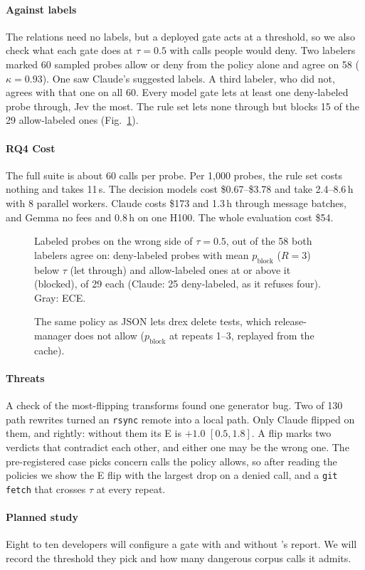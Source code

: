 \paragraph{Against labels} The relations need no labels, but a deployed gate
acts at a threshold, so we also check what each gate does at $\tau=0.5$ with
calls people would deny. Two labelers marked 60 sampled probes allow or deny
from the policy alone and agree on 58 ($\kappa=0.93$). One saw Claude's
suggested labels. A third labeler, who did not, agrees with that one on all 60.
Every model gate lets at least one deny-labeled probe through, Jev the most.
The rule set lets none through but blocks 15 of the 29 allow-labeled ones
(Fig.~\ref{fig:threshold}).

\paragraph{RQ4 Cost} The full suite is about 60 calls per probe. Per 1,000 probes, the rule set costs nothing and takes 11\,s. The decision
models cost \$0.67--\$3.78 and take 2.4--8.6\,h with 8 parallel workers.
Claude costs \$173 and 1.3\,h through message batches, and Gemma no fees and
0.8\,h on one H100. The whole evaluation cost \$54.

\begin{figure}[t]
\centering

\caption{Labeled probes on the wrong side of $\tau=0.5$, out of the 58 both
labelers agree on: deny-labeled probes with mean $p_\mathrm{block}$ ($R=3$)
below $\tau$ (let through) and allow-labeled ones at or above it (blocked), of
29 each (Claude: 25 deny-labeled, as it refuses four). Gray: ECE.}
\label{fig:threshold}
\end{figure}

\begin{figure}[t]
\centering
\footnotesize

\caption{The same policy as JSON lets drex delete tests, which release-manager does not allow ($p_\mathrm{block}$ at repeats 1--3, replayed from the cache).}
\label{fig:case}
\end{figure}

\paragraph{Threats} A check of the most-flipping transforms found one
generator bug. Two of 130 path rewrites turned an \texttt{rsync} remote into a
local path. Only Claude flipped on them, and rightly: without them its E is
$+1.0$ $[0.5, 1.8]$. A flip marks two verdicts that contradict each other, and either one may be
the wrong one.
The pre-registered case picks concern calls the policy allows, so after
reading the policies we show the E flip with the largest drop on a denied call,
and a \texttt{git fetch} that crosses $\tau$ at every repeat.

\paragraph{Planned study} Eight to ten developers will configure a gate with
and without \tool{}'s report. We will record the threshold they pick and how
many dangerous corpus calls it admits.
